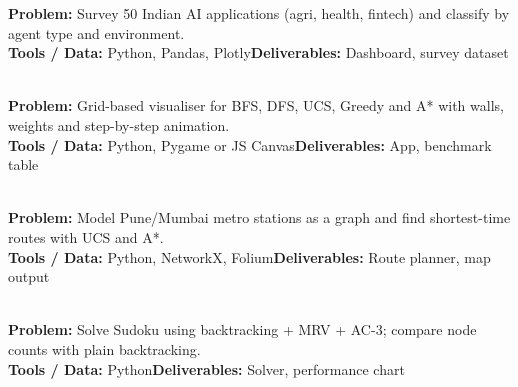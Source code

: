 \documentclass[11pt]{article}
\begin{document}
\begin{tcolorbox}[enhanced,breakable,colback=white,colframe=teal,arc=2mm,boxrule=0.9pt,
  title={\textbf{PI.10\quad AI Applications Survey Dashboard}\hfill \colorbox{white}{\textcolor{teal}{\scriptsize\bfseries MINI}}},fonttitle=\color{white},colbacktitle=teal]
\textbf{\color{navy}Problem:} Survey 50 Indian AI applications (agri, health, fintech) and classify by agent type and environment.\\[2pt]
\textbf{\color{navy}Tools / Data:} Python, Pandas, Plotly\qquad \textbf{\color{navy}Deliverables:} Dashboard, survey dataset\\[2pt]
\ 
\end{tcolorbox}
\newpage
{}
\begin{tcolorbox}[enhanced,breakable,colback=white,colframe=crimson,arc=2mm,boxrule=0.9pt,
  title={\textbf{PII.01\quad Pathfinding Visualiser}\hfill \colorbox{white}{\textcolor{crimson}{\scriptsize\bfseries MAJOR}}},fonttitle=\color{white},colbacktitle=crimson]
\textbf{\color{navy}Problem:} Grid-based visualiser for BFS, DFS, UCS, Greedy and A* with walls, weights and step-by-step animation.\\[2pt]
\textbf{\color{navy}Tools / Data:} Python, Pygame or JS Canvas\qquad \textbf{\color{navy}Deliverables:} App, benchmark table\\[2pt]
\ 
\end{tcolorbox}
\begin{tcolorbox}[enhanced,breakable,colback=white,colframe=teal,arc=2mm,boxrule=0.9pt,
  title={\textbf{PII.02\quad Pune Metro Route Planner}\hfill \colorbox{white}{\textcolor{teal}{\scriptsize\bfseries MINI}}},fonttitle=\color{white},colbacktitle=teal]
\textbf{\color{navy}Problem:} Model Pune/Mumbai metro stations as a graph and find shortest-time routes with UCS and A*.\\[2pt]
\textbf{\color{navy}Tools / Data:} Python, NetworkX, Folium\qquad \textbf{\color{navy}Deliverables:} Route planner, map output\\[2pt]
\ 
\end{tcolorbox}
\begin{tcolorbox}[enhanced,breakable,colback=white,colframe=teal,arc=2mm,boxrule=0.9pt,
  title={\textbf{PII.03\quad Sudoku Solver with AC-3}\hfill \colorbox{white}{\textcolor{teal}{\scriptsize\bfseries MINI}}},fonttitle=\color{white},colbacktitle=teal]
\textbf{\color{navy}Problem:} Solve Sudoku using backtracking + MRV + AC-3; compare node counts with plain backtracking.\\[2pt]
\textbf{\color{navy}Tools / Data:} Python\qquad \textbf{\color{navy}Deliverables:} Solver, performance chart\\[2pt]
\ 
\end{tcolorbox}
\end{document}
